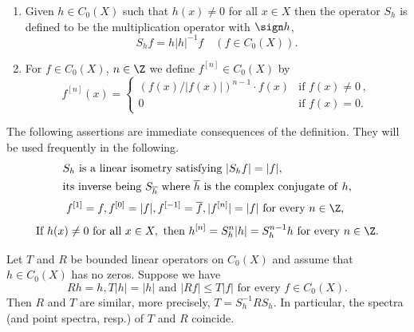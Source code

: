 	\begin{definition}\label{def:b3-2.2}
\begin{enumerate}[\upshape (i)]

\item
Given $h \in C_{0}(X)$ such that $h(x) \neq 0$ for all $x \in X$ then the operator $S_{h}$ is defined to be the multiplication operator with $ \sign h $, \ie
		\begin{equation}\label{eq:b3-2.3}
			S_{h}f = h|h|^{-1}f \quad (f \in C_{0}(X)).
		\end{equation}
		
\item
For $f \in C_{0}(X)$, $n \in \Z$ we define $f^{[n]} \in C_{0}(X)$ by
\begin{equation}\label{eq:b3-2.4}
	f^{[n]}(x) = 
	\begin{cases}
			(f(x)/|f(x)|)^{n-1}\cdot f(x) & \text{if } f(x) \neq 0\,,\\			
			0 & \text{if } f(x) = 0.
			\end{cases}
\end{equation}
\end{enumerate}
\end{definition}
The following assertions are immediate consequences of the definition. 
They will be used frequently in the following.
\begin{equation}\label{eq:b3-2.5}
	\begin{split}
		&S_{h} \text{  is a linear isometry satisfying  } |S_{h}f| = |f|, \\ 
		&\text{its inverse being  } S_{\overline{h}} \text{  where  } \overline{h} \text{ is the complex conjugate of\/ $ h $,}
	\end{split}
\end{equation}
\begin{equation}\label{eq:b3-2.6}
	    f^{[1]} = f, f^{[0]} = |f|, f^{[-1]} = \overline{f}, |f^{[n]}| = |f| \text{  for every $n \in \Z$, }
\end{equation}
\begin{equation}\label{eq:b3-2.7}
	\text{If  } h(x) \neq 0 \text{  for all  } x \in X, \text{  then  } h^{[n]} = S_{h}^{n}|h| = S_{h}^{n-1}h
	\text{  for every $ n \in \Z $.} 
\end{equation}
\begin{lemma}\label{lem:b3-2.3}%
Let $T$ and $R$ be bounded linear operators on $C_{0}(X)$ and assume that $h \in C_{0}(X)$ has no zeros. 
Suppose we have
\begin{equation}\label{eq:b3-2.8}
	Rh = h, T|h| = |h| \text{ and } |Rf| \leq T|f| \text{ for every $f \in C_{0}(X)$.} 
\end{equation}
Then $R$ and $T$ are similar, more precisely, $T = S_{h}^{-1}RS_{h}$.
In particular, the spectra (and point spectra, resp.) of\/ $T$ and $R$ coincide.
\end{lemma}
